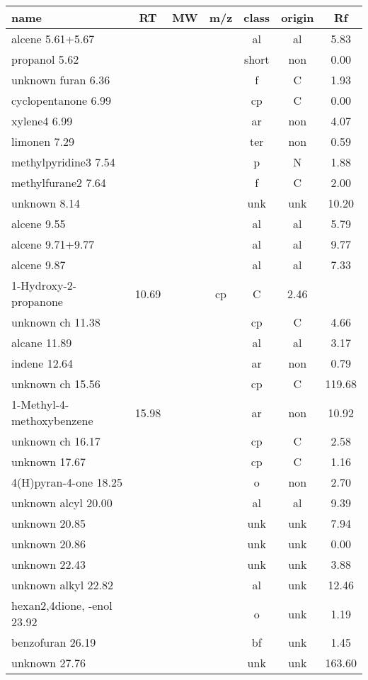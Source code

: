 \begin{table*}
\begin{center}
\begin{tabular}{lcccccc}
name & RT & MW & m/z & class & origin&Rf\\
\hline
alcene 5.61+5.67&&&&al&al&5.83\\
propanol 5.62&&&&short&non&0.00\\
unknown furan 6.36&&&&f&C&1.93\\
cyclopentanone 6.99&&&&cp&C&0.00\\
xylene4 6.99&&&&ar&non&4.07\\
limonen 7.29&&&&ter&non&0.59\\
methylpyridine3 7.54&&&&p&N&1.88\\
methylfurane2 7.64&&&&f&C&2.00\\
unknown 8.14&&&&unk&unk&10.20\\
alcene 9.55&&&&al&al&5.79\\
alcene 9.71+9.77&&&&al&al&9.77\\
alcene 9.87&&&&al&al&7.33\\
1-Hydroxy-2-propanone&10.69&&cp&C&2.46\\
unknown ch 11.38&&&&cp&C&4.66\\
alcane 11.89&&&&al&al&3.17\\
indene 12.64&&&&ar&non&0.79\\
unknown ch 15.56&&&&cp&C&119.68\\
1-Methyl-4-methoxybenzene&15.98&&&ar&non&10.92\\
unknown ch 16.17&&&&cp&C&2.58\\
unknown 17.67&&&&cp&C&1.16\\
4(H)pyran-4-one 18.25&&&&o&non&2.70\\
unknown alcyl 20.00&&&&al&al&9.39\\
unknown 20.85&&&&unk&unk&7.94\\
unknown 20.86&&&&unk&unk&0.00\\
unknown 22.43&&&&unk&unk&3.88\\
unknown alkyl 22.82&&&&al&unk&12.46\\
hexan2,4dione, -enol 23.92&&&&o&unk&1.19\\
benzofuran 26.19&&&&bf&unk&1.45\\
unknown 27.76&&&&unk&unk&163.60\\


\end{tabular}
\end{center}
\end{table*}
